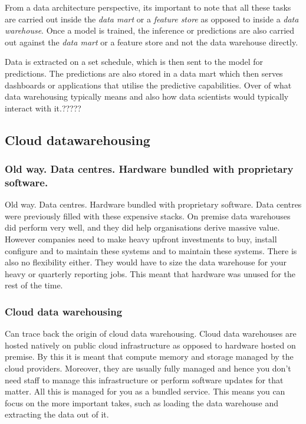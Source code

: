 From a data architecture perspective, its important to note that all these tasks are carried out inside the \textit{data mart} or a \textit{feature store} as opposed to inside a \textit{data warehouse}.
Once a model is trained, the inference or predictions are also carried out against the \textit{data mart} or a feature store and not the data warehouse directly.

Data is extracted on a set schedule, which is then sent to the model for predictions.
The predictions are also stored in a data mart which then serves dashboards or applications that utilise the predictive capabilities.
Over of what data warehousing typically means and also how data scientists would typically interact with it.?????

\subsection{Cloud datawarehousing}

\subsubsection{Old way. Data centres. Hardware bundled with proprietary software.}
Old way. Data centres. Hardware bundled with proprietary software.
Data centres were previously filled with these expensive stacks.
On premise data warehouses did perform very well, and they did help organisations derive massive value.
However companies need to make heavy upfront investments to buy, install configure and to maintain these systems and to maintain these systems.
There is also no flexibility either.
They would have to size the data warehouse for your heavy  or quarterly reporting jobs.
This meant that hardware was unused for the rest of the time.

\subsubsection{Cloud data warehousing}
Can trace back the origin of cloud data warehousing.
Cloud data warehouses are hosted natively on public cloud infrastructure as opposed to hardware hosted on premise.
By this it is meant that compute memory and storage managed by the cloud providers.
Moreover, they are usually fully managed and hence you don't need staff to manage this infrastructure or perform software updates for that matter.
All this is managed for you as a bundled service.
This means you can focus on the more important takes, such as loading the data warehouse and extracting the data out of it.

